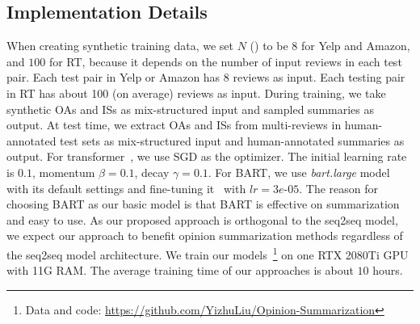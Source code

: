 \subsection{Implementation Details}
When creating synthetic training data, 
we set $N$ () to be $8$ for Yelp and Amazon,
and $100$ for RT, because it depends on the number of input reviews in each test pair. 
Each test pair in Yelp or Amazon has 8 reviews as input. Each testing pair in RT has about 100 (on average) reviews as input. 
During training, we take synthetic OAs and ISs as mix-structured input and sampled summaries as output.
At test time, we extract OAs and ISs from multi-reviews in human-annotated test sets as mix-structured input and human-annotated summaries as output.
For transformer~\cite{Transformer17}, we use SGD as the optimizer.
The initial learning rate is $0.1$, momentum $\beta=0.1$,  
decay $\gamma=0.1$. 
For BART, we use {\em bart.large} model with its 
default settings and fine-tuning it~\citet{BART20} with
$lr=3e$-$05$. 
The reason for choosing BART as our basic model is that BART is effective on summarization and easy to use. 
As our proposed approach is orthogonal to the seq2seq model, 
we expect our approach to benefit opinion summarization methods regardless of the seq2seq model architecture.
We train our models~\footnote{Data and code: \url{https://github.com/YizhuLiu/Opinion-Summarization}} on one RTX 2080Ti GPU with 11G RAM. 
The average training time of our approaches is about $10$ hours.


